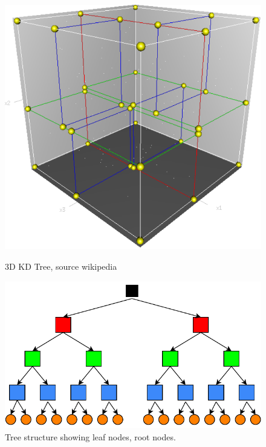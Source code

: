 \begin{figure}[htbp]
    \centering
    \begin{minipage}[b]{0.45\textwidth}
    \centering
    \includegraphics[width=1\linewidth]{97_graphics/related_work/kdtree_cube.pdf}
    \caption{3D KD Tree, source wikipedia}
    \label{fig:related_work-kdtree}
    \end{minipage}
    \hfill
    \begin{minipage}[b]{0.45\textwidth}
    \centering
    \includegraphics[width=1\linewidth]{97_graphics/related_work/kdtree_tree.pdf}
    \caption{Tree structure showing leaf nodes, root nodes.}
    \label{fig:related_work-search_tree}
    \end{minipage}
\end{figure}

